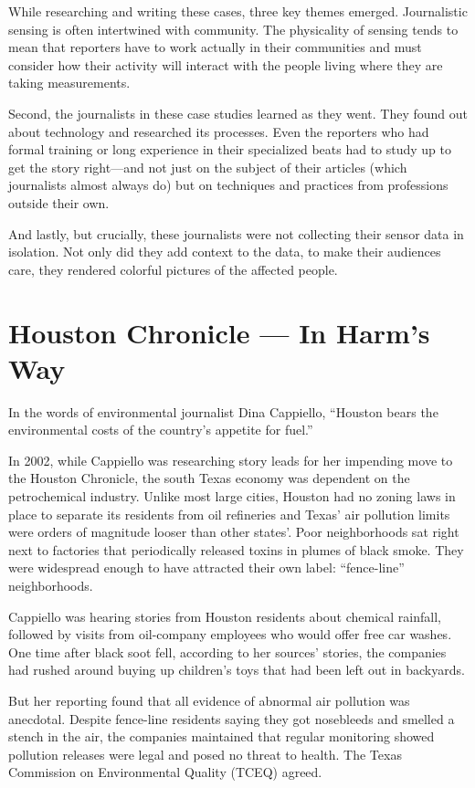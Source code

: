 While researching and writing these cases, three key themes emerged.
Journalistic sensing is often intertwined with community. The physicality
of sensing tends to mean that reporters have to work actually in their communities
and must consider how their activity will interact with the people
living where they are taking measurements.

Second, the journalists in these case studies learned as they went. They
found out about technology and researched its processes. Even the reporters
who had formal training or long experience in their specialized beats
had to study up to get the story right—and not just on the subject of their
articles (which journalists almost always do) but on techniques and practices
from professions outside their own.

And lastly, but crucially, these journalists were not collecting their sensor
data in isolation. Not only did they add context to the data, to make their
audiences care, they rendered colorful pictures of the affected people.

\chapter{Houston Chronicle — In Harm's Way}
In the words of environmental journalist Dina Cappiello, ``Houston bears
the environmental costs of the country's appetite for fuel.''

In 2002, while Cappiello was researching story leads for her impending
move to the Houston Chronicle, the south Texas economy was dependent
on the petrochemical industry. Unlike most large cities, Houston had no
zoning laws in place to separate its residents from oil refineries and Texas'
air pollution limits were orders of magnitude looser than other states'. Poor
neighborhoods sat right next to factories that periodically released toxins
in plumes of black smoke. They were widespread enough to have attracted
their own label: ``fence-line'' neighborhoods.

Cappiello was hearing stories from Houston residents about chemical rainfall,
followed by visits from oil-company employees who would offer free
car washes. One time after black soot fell, according to her sources' stories,
the companies had rushed around buying up children's toys that had been
left out in backyards.

But her reporting found that all evidence of abnormal air pollution was
anecdotal. Despite fence-line residents saying they got nosebleeds and
smelled a stench in the air, the companies maintained that regular monitoring
showed pollution releases were legal and posed no threat to health. The
Texas Commission on Environmental Quality (TCEQ) agreed.

